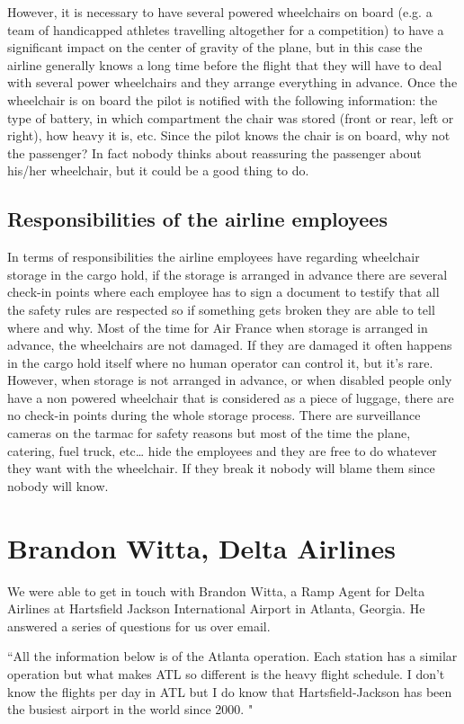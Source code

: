 However, it is necessary to have several powered wheelchairs on board (e.g. a team of handicapped athletes travelling altogether for a competition) to have a significant impact on the center of gravity of the plane, but in this case the airline generally knows a long time before the flight that they will have to deal with several power wheelchairs and they arrange everything in advance.
Once the wheelchair is on board the pilot is notified with the following information: the type of battery, in which compartment the chair was stored (front or rear, left or right), how heavy it is, etc. Since the pilot knows the chair is on board, why not the passenger? In fact nobody thinks about reassuring the passenger about his/her wheelchair, but it could be a good thing to do.

\subsection{Responsibilities of the airline employees}
In terms of responsibilities the airline employees have regarding wheelchair storage in the cargo hold, if the storage is arranged in advance there are several check-in points where each employee has to sign a document to testify that all the safety rules are respected so if something gets broken they are able to tell where and why. Most of the time for Air France when storage is arranged in advance, the wheelchairs are not damaged. If they are damaged it often happens in the cargo hold itself where no human operator can control it, but it’s rare. 
However, when storage is not arranged in advance, or when disabled people only have a non powered wheelchair that is considered as a piece of luggage, there are no check-in points during the whole storage process. There are surveillance cameras on the tarmac for safety reasons but most of the time the plane, catering, fuel truck, etc… hide the employees and they are free to do whatever they want with the wheelchair. If they break it nobody will blame them since nobody will know.

\section{Brandon Witta, Delta Airlines}
We were able to get in touch with Brandon Witta, a Ramp Agent for Delta Airlines at Hartsfield Jackson International Airport in Atlanta, Georgia. He answered a series of questions for us over email.

``All the information below is of the Atlanta operation. Each station has a similar operation but what makes ATL so different is the heavy flight schedule. I don't know the flights per day in ATL but I do know that Hartsfield-Jackson has been the busiest airport in the world since 2000. "

